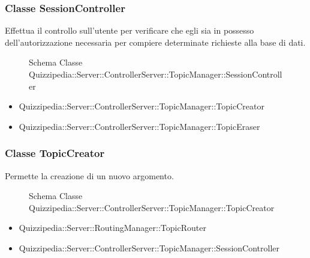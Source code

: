 \subsubsection{Classe SessionController}
Effettua il controllo sull'utente per verificare che egli sia in possesso dell'autorizzazione necessaria per compiere determinate richieste alla base di dati.
\begin{figure}[H]
\centering
\noindent{}
\caption{Schema Classe Quizzipedia::Server::ControllerServer::TopicManager::SessionController}
\end{figure}
\begin{itemize}
\item Quizzipedia::Server::ControllerServer::TopicManager::TopicCreator
\item Quizzipedia::Server::ControllerServer::TopicManager::TopicEraser
\end{itemize}
\subsubsection{Classe TopicCreator}
Permette la creazione di un nuovo argomento.
\begin{figure}[H]
\centering
\noindent{}
\caption{Schema Classe Quizzipedia::Server::ControllerServer::TopicManager::TopicCreator}
\end{figure}
\begin{itemize}
\item Quizzipedia::Server::RoutingManager::TopicRouter
\end{itemize}
\begin{itemize}
\item Quizzipedia::Server::ControllerServer::TopicManager::SessionController
\end{itemize}
